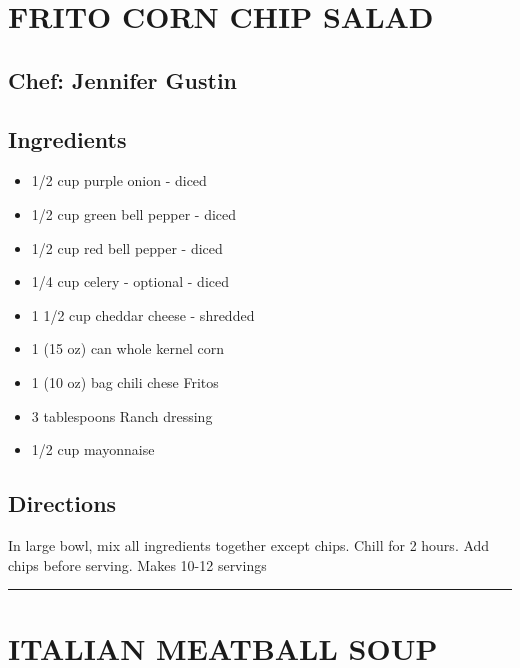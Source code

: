 \documentclass[
]{book}
\providecommand{\tightlist}{%
  \setlength{\itemsep}{0pt}\setlength{\parskip}{0pt}}
\begin{document}
\hypertarget{frito-corn-chip-salad}{%
\section*{FRITO CORN CHIP SALAD}\label{frito-corn-chip-salad}}


\hypertarget{chef-jennifer-gustin-4}{%
\subsection*{Chef: Jennifer Gustin}\label{chef-jennifer-gustin-4}}


\hypertarget{ingredients-18}{%
\subsection*{Ingredients}\label{ingredients-18}}


\begin{itemize}
\tightlist
\item
  1/2 cup purple onion - diced
\item
  1/2 cup green bell pepper - diced
\item
  1/2 cup red bell pepper - diced
\item
  1/4 cup celery - optional - diced
\item
  1 1/2 cup cheddar cheese - shredded
\item
  1 (15 oz) can whole kernel corn
\item
  1 (10 oz) bag chili chese Fritos
\item
  3 tablespoons Ranch dressing
\item
  1/2 cup mayonnaise
\end{itemize}

\hypertarget{directions-18}{%
\subsection*{Directions}\label{directions-18}}


In large bowl, mix all ingredients together except chips. Chill for 2 hours. Add chips before serving. Makes 10-12 servings

\begin{center}\rule{0.5\linewidth}{0.5pt}\end{center}

\hypertarget{italian-meatball-soup}{%
\section*{ITALIAN MEATBALL SOUP}\label{italian-meatball-soup}}
\end{document}
